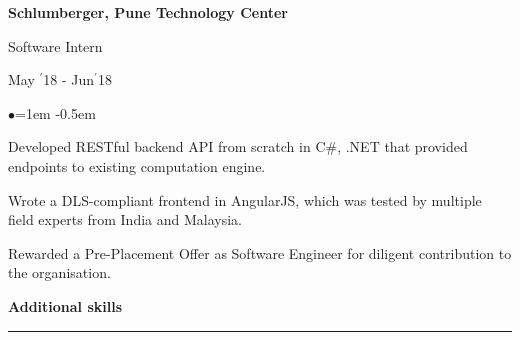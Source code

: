\documentclass[11pt, a4paper]{resume}
\newcommand{\important}[1]{
	\textcolor{mypurple}{#1}
}
\newcommand{\sectionTitle}[1]{
	\begin{Large}
    	\important{\textbf{#1}}\newline
    \end{Large}
    \important{\noindent\rule{19cm}{0.4pt}} \newline
}
\newcommand\textbox[1]{
  \parbox{.333\textwidth}{#1}
}
\newenvironment{Jobsection}[3]{ %
\noindent\textbox{\bf #1\hfill}\textbox{\hfil #2\hfil}\textbox{\hfill #3}
  \begin{list}{$\bullet$}{\leftmargin=1em} %
   \itemsep -0.5em \vspace{-0.5em} %
  }{
  \end{list}
  \vspace{0.5em} %
}
\begin{document}
\begin{Jobsection}{Schlumberger, Pune Technology Center}{Software Intern}{ May $^{\prime}$18 
- Jun$^{\prime}$18}
\item Developed RESTful backend API from scratch in C\#, .NET that provided endpoints to 
existing computation engine.
\item Wrote a DLS-compliant frontend in AngularJS, which was tested  by multiple field 
experts from India and Malaysia.
\item Rewarded a Pre-Placement Offer as Software Engineer for diligent contribution to the 
organisation.
\end{Jobsection}

\sectionTitle{Additional skills}
\end{document}
